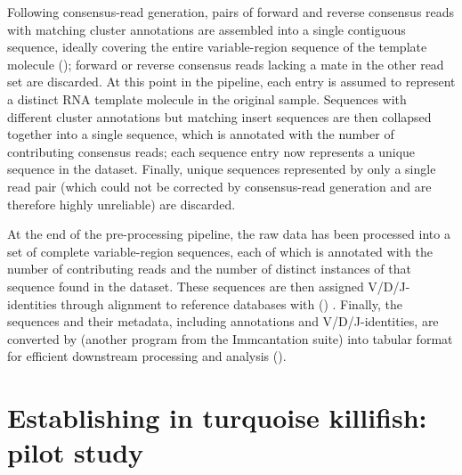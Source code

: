 Following consensus-read generation, pairs of forward and reverse consensus reads with matching cluster annotations are assembled into a single contiguous sequence, ideally covering the entire variable-region sequence of the template molecule (); forward or reverse consensus reads lacking a mate in the other read set are discarded. At this point in the pipeline, each entry is assumed to represent a distinct RNA template molecule in the original sample. Sequences with different cluster annotations but matching insert sequences are then collapsed together into a single sequence, which is annotated with the number of contributing consensus reads; each sequence entry now represents a unique sequence in the dataset. Finally, unique sequences represented by only a single read pair (which could not be corrected by consensus-read generation and are therefore highly unreliable) are discarded.

At the end of the  pre-processing pipeline, the raw data has been processed into a set of complete variable-region sequences, each of which is annotated with the number of contributing reads and the number of distinct instances of that sequence found in the dataset. These sequences are then assigned V/D/J-identities through alignment to reference databases with  () \parencite{ye2013igblast}. Finally, the sequences and their metadata, including annotations and V/D/J-identities, are converted by  (another program from the Immcantation suite) \parencite{gupta2015changeo} into tabular format for efficient downstream processing and analysis ().


\section{Establishing \igseq in turquoise killifish: pilot study}
\label{sec:igseq_pilot}

